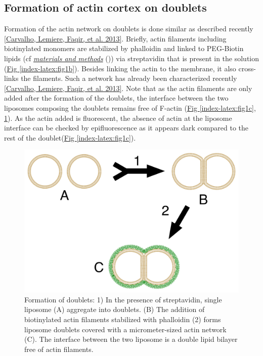 \documentclass[A4paperpaper,11pt,english]{sphinxmanual}
\begin{document}
\subsection{Formation of actin cortex on doublets}
\label{index-latex:formation-of-actin-cortex-on-doublets}
Formation of the actin network on doublets is done similar as described
recently {\hyperref[index-latex:carvalho2013a]{{[}Carvalho, Lemiere, Faqir,  et al.  2013{]}}}.  Briefly, actin filaments including
biotinylated monomers are stabilized by phalloidin and linked to PEG-Biotin
lipids (cf {\hyperref[index-latex:m-et-m]{\emph{materials and methods}}} ())  via streptavidin that is
present in the solution (\hyperref[index-latex:fig1b]{Fig  \ref*{index-latex:fig1b}}).  Besides linking the actin to the
membrane, it also cross-links the filaments.  Such a network has already been
characterized recently {\hyperref[index-latex:carvalho2013a]{{[}Carvalho, Lemiere, Faqir,  et al.  2013{]}}}.  Note that as the actin filaments
are only added after the formation of the doublets, the interface between the
two liposomes composing the doublets remains free of F-actin (\hyperref[index-latex:fig1c]{Fig  \ref*{index-latex:fig1c}}, \hyperref[index-latex:fds]{ \ref*{index-latex:fds}}). As the actin added is fluorescent, the absence of actin
at the liposome interface can be checked by epifluorescence as it appears dark
compared to the rest of the doublet(\hyperref[index-latex:fig1c]{Fig  \ref*{index-latex:fig1c}}).
\begin{figure}[htbp]
\centering
\capstart

\includegraphics[width=0.700\linewidth]{doublets-schema.png}
\caption{Formation of doublets: 1) In the presence of streptavidin, single liposome
(A) aggregate into doublets. (B) The addition of biotinylated actin
filaments stabilized with phalloidin (2) forms liposome doublets covered
with a micrometer-sized actin network (C). The interface between the two
liposome is a double lipid bilayer free of actin filaments.}\label{index-latex:fds}\end{figure}
\end{document}
